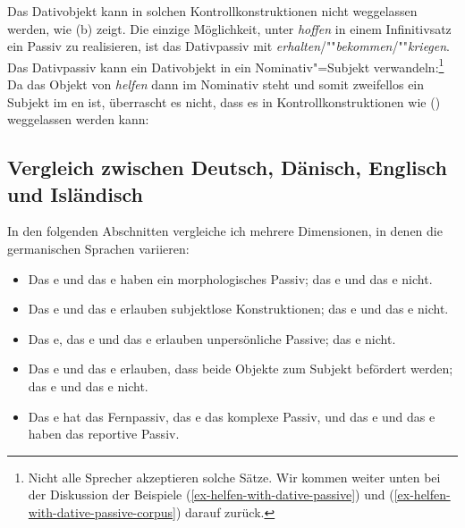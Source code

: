 \eal
{}
\zl
Das Dativobjekt kann in solchen Kontrollkonstruktionen nicht weggelassen werden, wie (b) zeigt. Die einzige Möglichkeit,
unter \emph{hoffen} in einem Infinitivsatz ein Passiv zu realisieren, ist das Dativpassiv mit
\emph{erhalten}/""\emph{bekommen}/""\emph{kriegen}. Das Dativpassiv kann ein Dativobjekt in ein
Nominativ"=Subjekt verwandeln:\footnote{
  Nicht alle Sprecher akzeptieren solche Sätze. Wir kommen weiter unten bei der Diskussion der Beispiele
  (\ref{ex-helfen-with-dative-passive}) und (\ref{ex-helfen-with-dative-passive-corpus}) darauf zurück.
}
\z
Da das Objekt von \emph{helfen} dann im Nominativ steht und somit zweifellos ein Subjekt im en ist, überrascht es nicht, dass es in Kontrollkonstruktionen wie () weggelassen werden kann:
\z
{}

\subsection{Vergleich zwischen Deutsch, Dänisch, Englisch und Isländisch}

In den folgenden Abschnitten vergleiche ich mehrere Dimensionen, in denen die germanischen Sprachen
variieren:
\begin{itemize}
\item Das e und das e haben ein morphologisches Passiv; das e und das e nicht.

\item Das e und das e erlauben subjektlose Konstruktionen; das e und das e nicht.

\item Das e, das e und das e erlauben unpersönliche Passive; das e nicht.

\item Das e und das e erlauben, dass beide Objekte zum Subjekt befördert werden; das e und das e nicht.

\item Das e hat das Fernpassiv, das e das komplexe Passiv, und das e und das e
  haben das reportive Passiv.
\end{itemize}

